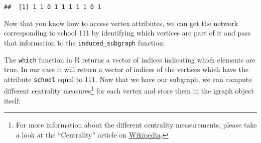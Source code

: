 \documentclass[]{book}
\newenvironment{Shaded}{\begin{snugshade}}{\end{snugshade}}
\newcommand{\KeywordTok}[1]{\textcolor[rgb]{0.13,0.29,0.53}{\textbf{#1}}}
\newcommand{\DataTypeTok}[1]{\textcolor[rgb]{0.13,0.29,0.53}{#1}}
\newcommand{\DecValTok}[1]{\textcolor[rgb]{0.00,0.00,0.81}{#1}}
\newcommand{\StringTok}[1]{\textcolor[rgb]{0.31,0.60,0.02}{#1}}
\newcommand{\CommentTok}[1]{\textcolor[rgb]{0.56,0.35,0.01}{\textit{#1}}}
\newcommand{\OtherTok}[1]{\textcolor[rgb]{0.56,0.35,0.01}{#1}}
\newcommand{\OperatorTok}[1]{\textcolor[rgb]{0.81,0.36,0.00}{\textbf{#1}}}
\newcommand{\NormalTok}[1]{#1}
\let\rmarkdownfootnote\footnote%
\def\footnote{\protect\rmarkdownfootnote}
\theoremstyle{definition}
\theoremstyle{definition}
\theoremstyle{definition}
\theoremstyle{remark}
\begin{document}
\begin{verbatim}
##  [1] 1 1 0 1 1 1 1 1 0 1
\end{verbatim}

Now that you know how to access vertex attributes, we can get the
network corresponding to school 111 by identifying which vertices are
part of it and pass that information to the \texttt{induced\_subgraph}
function:

\begin{Shaded}
\end{Shaded}

The \texttt{which} function in R returns a vector of indices indicating
which elements are true. In our case it will return a vector of indices
of the vertices which have the attribute \texttt{school} equal to 111.
Now that we have our subgraph, we can compute different centrality
measures\footnote{For more information about the different centrality
  measurements, please take a look at the ``Centrality'' article on
  \href{https://en.wikipedia.org/wiki/Centrality}{Wikipedia}.} for each
vertex and store them in the igraph object itself:

\begin{Shaded}
\end{Shaded}
\end{document}
